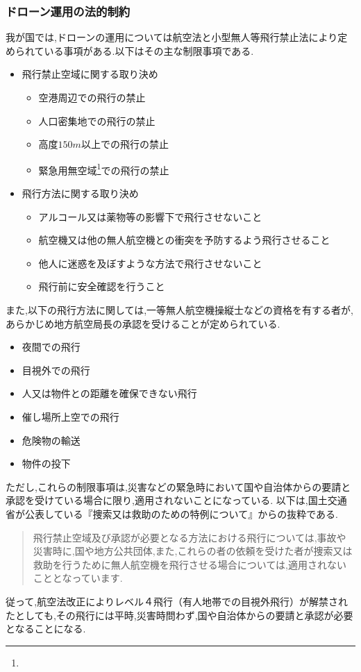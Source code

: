\documentclass{article}[jsarticle]
\begin{document}
\subsubsection{ドローン運用の法的制約}
我が国では,ドローンの運用については航空法と小型無人等飛行禁止法により定められている事項がある.以下はその主な制限事項である.
\begin{itemize}
    \item 飛行禁止空域に関する取り決め
    \begin{itemize}
        \item 空港周辺での飛行の禁止
        \item 人口密集地での飛行の禁止
        \item 高度$150m$以上での飛行の禁止
        \item 緊急用無空域\footnote{}での飛行の禁止
    \end{itemize}
    \item 飛行方法に関する取り決め
    \begin{itemize}
        \item アルコール又は薬物等の影響下で飛行させないこと
        \item 航空機又は他の無人航空機との衝突を予防するよう飛行させること
        \item 他人に迷惑を及ぼすような方法で飛行させないこと
        \item 飛行前に安全確認を行うこと 
    \end{itemize}
\end{itemize}
また,以下の飛行方法に関しては,一等無人航空機操縦士などの資格を有する者が,あらかじめ地方航空局長の承認を受けることが定められている.
\begin{itemize}
    \item 夜間での飛行
    \item 目視外での飛行
    \item 人又は物件との距離を確保できない飛行
    \item 催し場所上空での飛行
    \item 危険物の輸送
    \item 物件の投下
\end{itemize}
ただし,これらの制限事項は,災害などの緊急時において国や自治体からの要請と承認を受けている場合に限り,適用されないことになっている.
以下は,国土交通省が公表している『捜索又は救助のための特例について』からの抜粋である.
\begin{quote}
    飛行禁止空域及び承認が必要となる方法における飛行については,事故や災害時に,国や地方公共団体,また,これらの者の依頼を受けた者が捜索又は救助を行うために無人航空機を飛行させる場合については,適用されないこととなっています.
\end{quote}
従って,航空法改正によりレベル４飛行（有人地帯での目視外飛行）が解禁されたとしても,その飛行には平時,災害時問わず,国や自治体からの要請と承認が必要となることになる.
\end{document}
